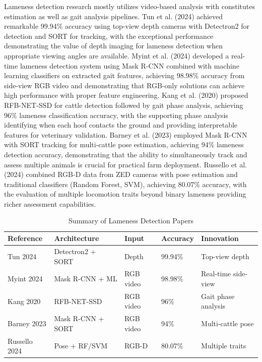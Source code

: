 Lameness detection research mostly utilizes video-based analysis with constitutes estimation as well as gait analysis pipelines. Tun et al. (2024) \cite{tun2024depth} achieved remarkable 99.94\% accuracy using top-view depth cameras with Detectron2 for detection and SORT for tracking, with the exceptional performance demonstrating the value of depth imaging for lameness detection when appropriate viewing angles are available. Myint et al. (2024) \cite{myint2024lameness} developed a real-time lameness detection system using Mask R-CNN combined with machine learning classifiers on extracted gait features, achieving 98.98\% accuracy from side-view RGB video and demonstrating that RGB-only solutions can achieve high performance with proper feature engineering. Kang et al. (2020) \cite{kang2020lameness} proposed RFB-NET-SSD for cattle detection followed by gait phase analysis, achieving 96\% lameness classification accuracy, with the supporting phase analysis identifying when each hoof contacts the ground and providing interpretable features for veterinary validation. Barney et al. (2023) \cite{barney2023multipose} employed Mask R-CNN with SORT tracking for multi-cattle pose estimation, achieving 94\% lameness detection accuracy, demonstrating that the ability to simultaneously track and assess multiple animals is crucial for practical farm deployment. Russello et al. (2024) \cite{russello2024zed} combined RGB-D data from ZED cameras with pose estimation and traditional classifiers (Random Forest, SVM), achieving 80.07\% accuracy, with the evaluation of multiple locomotion traits beyond binary lameness providing richer assessment capabilities.

\begin{table}[h]
\centering
\caption{Summary of Lameness Detection Papers}
\label{tab:lameness_papers}
\begin{tabular}{|p{2.5cm}|p{3.8cm}|p{2cm}|p{2cm}|p{2.5cm}|}
\hline
\textbf{Reference} & \textbf{Architecture} & \textbf{Input} & \textbf{Accuracy} & \textbf{Innovation} \\
\hline
Tun 2024 & Detectron2 + SORT & Depth & 99.94\% & Top-view depth \\
\hline
Myint 2024 & Mask R-CNN + ML & RGB video & 98.98\% & Real-time side-view \\
\hline
Kang 2020 & RFB-NET-SSD & RGB video & 96\% & Gait phase analysis \\
\hline
Barney 2023 & Mask R-CNN + SORT & RGB video & 94\% & Multi-cattle pose \\
\hline
Russello 2024 & Pose + RF/SVM & RGB-D & 80.07\% & Multiple traits \\
\hline
\end{tabular}
\end{table}

